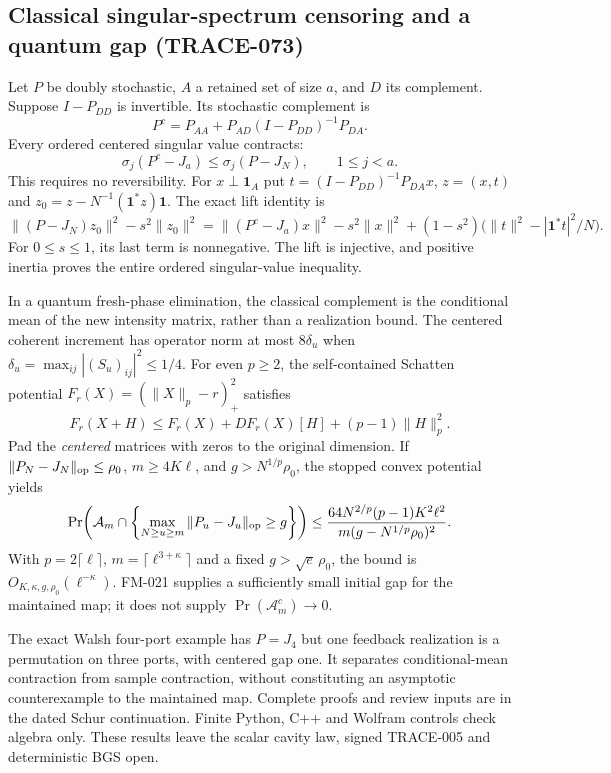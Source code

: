 \subsection{Classical singular-spectrum censoring and a quantum gap (TRACE-073)}
Let $P$ be doubly stochastic, $A$ a retained set of size $a$, and $D$ its
complement. Suppose $I-P_{DD}$ is invertible. Its stochastic complement is
\[
 P^c=P_{AA}+P_{AD}(I-P_{DD})^{-1}P_{DA}.
\]
Every ordered centered singular value contracts:
\[
 \sigma_j(P^c-J_a)\le\sigma_j(P-J_N),\qquad 1\le j<a.
\]
This requires no reversibility. For $x\perp\mathbf1_A$ put
$t=(I-P_{DD})^{-1}P_{DA}x$, $z=(x,t)$ and
$z_0=z-N^{-1}(\mathbf1^*z)\mathbf1$. The exact lift identity is
\[
 \|(P-J_N)z_0\|^2-s^2\|z_0\|^2
 =\|(P^c-J_a)x\|^2-s^2\|x\|^2
 +(1-s^2)\bigl(\|t\|^2-|\mathbf1^*t|^2/N\bigr).
\]
For $0\le s\le1$, its last term is nonnegative. The lift is injective,
and positive inertia proves the entire ordered singular-value inequality.

In a quantum fresh-phase elimination, the classical complement is the
conditional mean of the new intensity matrix, rather than a realization
bound. The centered coherent increment has operator norm at most
$8\delta_u$ when $\delta_u=\max_{ij}|(S_u)_{ij}|^2\le1/4$.
For even $p\ge2$, the self-contained Schatten potential
$F_r(X)=(\|X\|_p-r)_+^2$ satisfies
\[
 F_r(X+H)\le F_r(X)+DF_r(X)[H]+(p-1)\|H\|_p^2.
\]
Pad the \emph{centered} matrices with zeros to the original dimension.
If $\|P_N-J_N\|_{\rm op}\le\rho_0$, $m\ge4K\ell$, and
$g>N^{1/p}\rho_0$, the stopped convex potential yields
\[
 \Pr\!\left(\mathcal A_m\cap
       \left\{\max_{N\ge u\ge m}\|P_u-J_u\|_{\rm op}\ge g\right\}\right)
 \le\frac{64N^{2/p}(p-1)K^2\ell^2}
               {m(g-N^{1/p}\rho_0)^2}.
\]
With $p=2\lceil\ell\rceil$, $m=\lceil\ell^{3+\kappa}\rceil$ and a fixed
$g>\sqrt e\,\rho_0$, the bound is $O_{K,\kappa,g,\rho_0}(\ell^{-\kappa})$.
FM-021 supplies a sufficiently small initial gap for the maintained map;
it does not supply $\Pr(\mathcal A_m^c)\to0$.

The exact Walsh four-port example has $P=J_4$ but one feedback realization
is a permutation on three ports, with centered gap one. It separates
conditional-mean contraction from sample contraction, without constituting
an asymptotic counterexample to the maintained map. Complete proofs and
review inputs are in the dated Schur continuation. Finite Python, C++ and
Wolfram controls check algebra only. These results leave the scalar cavity
law, signed TRACE-005 and deterministic BGS open.

